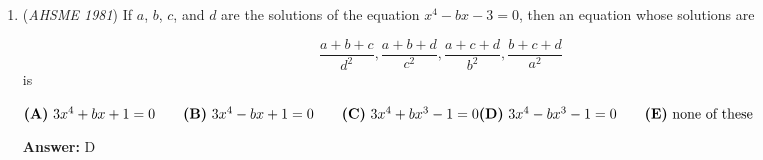 \begin{enumerate}
 Squaring both sides again yields $a^2 - 2ax^2 + x^4 = a + x$.  Collecting all terms on the yields $a^2 - 2ax^2 - a + x^4 - x =$ $a^2 - (2x^2 + 1) a + (x^4 - x) = 0$.  

 Using the quadratic formula, $a = \frac{2x^2+1 \pm \sqrt{(2x^2+1)^2 - 4(x^4 -x)}}{2} =$ $\frac{2x^2 + 1 \pm \sqrt{4x^2 + 4x + 1}}{2} = \frac{2x^2 + 1 \pm (2x + 1)}{2}$, so either $a = x^2 + x + 1$ or $a = x^2 - x$.

 If $a = x^2 + x + 1$, then $x^2 + x + (1-a) = 0$, and by the quadratic formula, $x = \frac{-1 \pm \sqrt{1 - 4(1-a)}}{2} = \frac{-1 \pm \sqrt{4a - 3}}{2}$.  Since $\frac{-1-\sqrt{4a-3}}{2}$ is negative, it cannot a valid solution.  However, $\frac{-1+\sqrt{4a-3}}{2} \geq \frac{-1+1}{2} = 0$, and $\frac{-1+\sqrt{4a-3}}{2} < \frac{-1 + 2\sqrt{a}}{2} = -\frac{1}{2} + \sqrt{a} < \sqrt{a}$, so $\frac{-1+\sqrt{4a-3}}{2}$ is a valid solution.

 If $a = x^2 - x$, then $x^2 - x - a = 0$, and by the quadratic formula, $x = \frac{1 \pm \sqrt{1+4a}}{2}$.  But $\frac{1-\sqrt{1+4a}}{2} < \frac{1-1}{2} = 0$, and $\frac{1+\sqrt{1+4a}}{2} > \frac{\sqrt{1+4a}}{2} > \frac{\sqrt{4a}}{2} = \sqrt{a}$, so neither of these are valid solutions.

 Therefore, $x = \frac{-1+\sqrt{4a-3}}{2}$ is the only solution to the original equation, so the sum of all solutions is $\boxed{(\textbf{E})\ \frac{-1+\sqrt{4a-3}}{2}}$.

 -OliverA, edited by j314andrews.  Similar to the alternate solution from The Contest Problem Book IV.

 \textit{Note}: One might notice that when $a=3$, the solution of the original equation is $x=1$. This eliminates all choices except (E).

 -- OliverA

 


	\item (\textit{AHSME 1981}) If $a$, $b$, $c$, and $d$ are the solutions of the equation $x^4 - bx - 3 = 0$, then an equation whose solutions are 

 \[\dfrac {a + b + c}{d^2}, \dfrac {a + b + d}{c^2}, \dfrac {a + c + d}{b^2}, \dfrac {b + c + d}{a^2}\]is


 $\textbf{(A)}\ 3x^4 + bx + 1 = 0\qquad \textbf{(B)}\ 3x^4 - bx + 1 = 0\qquad \textbf{(C)}\ 3x^4 + bx^3 - 1 = 0\qquad \\\textbf{(D)}\ 3x^4 - bx^3 - 1 = 0\qquad  \textbf{(E)}\ \text{none of these}$

 \textbf{Answer: }D




\end{enumerate}
